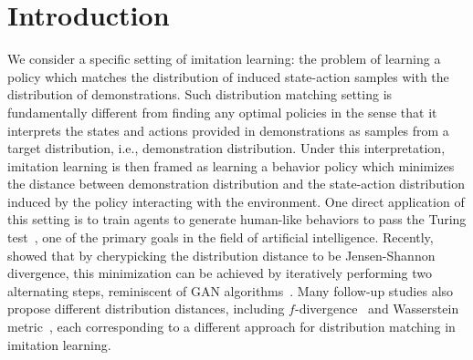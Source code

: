 \section{Introduction}

We consider a specific setting of imitation learning:
the problem of learning a policy which matches the distribution of induced state-action samples with the distribution of demonstrations. 
Such distribution matching setting is fundamentally different from finding any optimal policies in the sense that it interprets the states and actions provided in demonstrations as samples from a target distribution, i.e., demonstration distribution. 
Under this interpretation, imitation learning is then framed as learning a behavior policy which minimizes the distance between demonstration distribution and the state-action distribution induced by the policy interacting with the environment. 
One direct application of this setting is to train agents to generate human-like behaviors to pass the Turing test~\citep{saygin2000turing}, one of the primary goals in the field of artificial intelligence. 
Recently, \citet{ho2016generative} showed that by cherypicking the distribution distance to be Jensen-Shannon divergence, this minimization can be achieved by iteratively performing two alternating steps, reminiscent of GAN algorithms~\citep{goodfellow2014generative}. 
Many follow-up studies also propose different distribution distances, including $f$-divergence~\citep{ke2019imitation} and Wasserstein metric~\citep{xiao2019wasserstein}, each corresponding to a different approach for distribution matching in imitation learning. 



